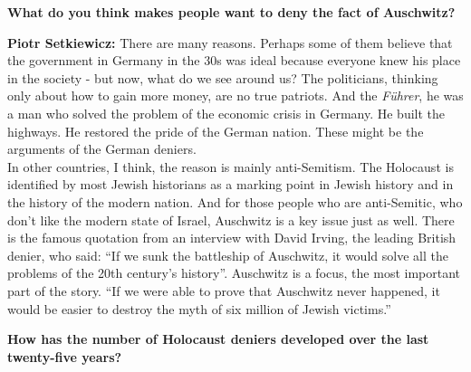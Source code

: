 \textbf{What do you think makes people want to deny the fact of Auschwitz?}

\textbf{Piotr Setkiewicz:} There are many reasons. Perhaps some of them believe that the government in Germany in the 30s was ideal because everyone knew his place in the society - but now, what do we see around us? The politicians, thinking only about how to gain more money, are no true patriots. And the \textit{Führer}, he was a man who solved the problem of the economic crisis in Germany. He built the highways. He restored the pride of the German nation. These might be the arguments of the German deniers.\\
In other countries, I think, the reason is mainly anti-Semitism. The Holocaust is identified by most Jewish historians as a marking point in Jewish history and in the history of the modern nation. And for those people who are anti-Semitic, who don’t like the modern state of Israel, Auschwitz is a key issue just as well. There is the famous quotation from an interview with David Irving, the leading British denier, who said: ``If we sunk the battleship of Auschwitz, it would solve all the problems of the 20th century’s history''. Auschwitz is a focus, the most important part of the story. ``If we were able to prove that Auschwitz never happened, it would be easier to destroy the myth of six million of Jewish victims.''

\textbf{How has the number of Holocaust deniers developed over the last twenty-five years?}

